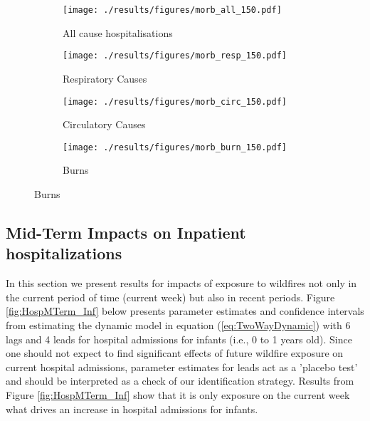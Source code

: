 \documentclass[11pt]{article}
\begin{document}
\begin{spacing}{1.3}
\begin{figure}[htpb!]
    \centering
    \caption{Impacts of Fire Exposure (Upwind) on Age-Specific Hospitalisations, by Cause}
    \label{fig:hospRF_byAge_types}
    \begin{subfigure}{0.49\textwidth}
    \centering
    \texttt{[image: ./results/figures/morb\_all\_150.pdf]}
    \caption{All cause hospitalisations}
    \end{subfigure}    
    \begin{subfigure}{0.49\textwidth}
    \centering
    \texttt{[image: ./results/figures/morb\_resp\_150.pdf]}
    \caption{Respiratory Causes}
    \end{subfigure}    
    \begin{subfigure}{0.49\textwidth}
    \centering
    \texttt{[image: ./results/figures/morb\_circ\_150.pdf]}
    \caption{Circulatory Causes}
    \end{subfigure}    
    \begin{subfigure}{0.49\textwidth}
    \centering
    \texttt{[image: ./results/figures/morb\_burn\_150.pdf]}
    \caption{Burns}
    \end{subfigure}    
\end{figure}

\clearpage

\subsection{Mid-Term Impacts on Inpatient hospitalizations}
In this section we present results for impacts of exposure to wildfires not only in the current period of time (current week) but also in recent periods. Figure  \ref{fig:HospMTerm_Inf} below presents parameter estimates and confidence intervals from estimating the dynamic model in equation (\ref{eq:TwoWayDynamic}) with 6 lags and 4 leads for hospital admissions for infants (i.e., 0 to 1 years old). Since one should not expect to find significant effects of future wildfire exposure on current hospital admissions, parameter estimates for leads act as a 'placebo test' and should be interpreted as a check of our identification strategy. Results from Figure \ref{fig:HospMTerm_Inf} show that it is only exposure on the current week what drives an increase in hospital admissions for infants. 


\end{spacing}
\end{document}
